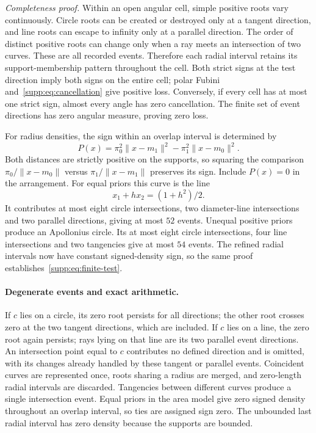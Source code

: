 \emph{Completeness proof.}
Within an open angular cell, simple positive roots vary continuously. Circle roots can be created or destroyed only at a tangent direction, and line roots can escape to infinity only at a parallel direction. The order of distinct positive roots can change only when a ray meets an intersection of two curves. These are all recorded events. Therefore each radial interval retains its support-membership pattern throughout the cell. Both strict signs at the test direction imply both signs on the entire cell; polar Fubini and~\eqref{supp:eq:cancellation} give positive loss. Conversely, if every cell has at most one strict sign, almost every angle has zero cancellation. The finite set of event directions has zero angular measure, proving zero loss.

For radius densities, the sign within an overlap interval is determined by
\begin{equation}
 P(x)=\pi_0^2\|x-m_1\|^2-\pi_1^2\|x-m_0\|^2.
 \label{supp:eq:apollonius}
\end{equation}
Both distances are strictly positive on the supports, so squaring the comparison $\pi_0/\|x-m_0\|$ versus $\pi_1/\|x-m_1\|$ preserves its sign. Include $P(x)=0$ in the arrangement. For equal priors this curve is the line
\[
 x_1+hx_2=(1+h^2)/2.
\]
It contributes at most eight circle intersections, two diameter-line intersections and two parallel directions, giving at most $52$ events. Unequal positive priors produce an Apollonius circle. Its at most eight circle intersections, four line intersections and two tangencies give at most $54$ events. The refined radial intervals now have constant signed-density sign, so the same proof establishes~\eqref{supp:eq:finite-test}.

\paragraph{Degenerate events and exact arithmetic.}
If $c$ lies on a circle, its zero root persists for all directions; the other root crosses zero at the two tangent directions, which are included. If $c$ lies on a line, the zero root again persists; rays lying on that line are its two parallel event directions. An intersection point equal to $c$ contributes no defined direction and is omitted, with its changes already handled by these tangent or parallel events. Coincident curves are represented once, roots sharing a radius are merged, and zero-length radial intervals are discarded. Tangencies between different curves produce a single intersection event. Equal priors in the area model give zero signed density throughout an overlap interval, so ties are assigned sign zero. The unbounded last radial interval has zero density because the supports are bounded.

